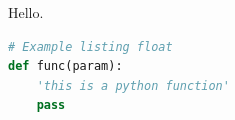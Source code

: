 \documentclass{scrbook}
\begin{document}
Hello.

\begin{lstlisting}[caption={Example Listing float},language=Python]
# Example listing float
def func(param):
    'this is a python function'
    pass
\end{lstlisting}
\end{document}
